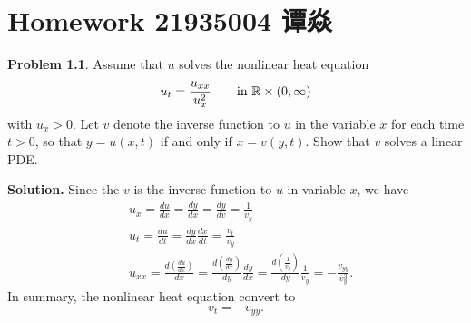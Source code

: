 \documentclass[a4paper]{book}
\makeatletter
\newenvironment{solution}%
{\noindent\textbf{Solution.}}%
{\qedhere}
\newcommand{\voidenvironment}[1]{%
  \expandafter\providecommand\csname env@#1@save@env\endcsname{}%
  \expandafter\providecommand\csname env@#1@process\endcsname{}%
  \@ifundefined{#1}{}{\RenewEnviron{#1}{}}%
}
\numberwithin{equation}{chapter}
\theoremstyle{definition}
\newtheorem{pro}[exm]{Problem}
\makeatother
\begin{document}
\pagestyle{empty}
% 



\setcounter{chapter}{10}




\chapter{Homework 21935004 谭焱}


\begin{pro}
  Assume that $u$ solves the nonlinear heat equation
  \[u_t = \frac{u_{xx}}{u_x^2} \qquad \textmd{in } \mathbb{R} \times (0, \infty)\]
  with $u_x > 0$. Let $v$ denote the inverse function to $u$ in the variable $x$ for each time $t > 0$, so that $y = u(x,t)$ if and only if $x = v(y,t)$. Show that $v$ solves a linear PDE.
\end{pro}

\begin{solution}
  Since the $v$ is the inverse function to $u$ in variable $x$, we have
  \begin{align*}
    &u_x = \frac{d u}{d x} 
    =\frac{d y}{d x}
    =\frac{d y}{d v}
      =\frac{1}{v_y} \\
    &u_t = \frac{du}{dt}
      = \frac{dy}{dx} \frac{dx}{dt}
      = \frac{v_t}{v_y}\\
    &u_{xx} = \frac{d \left( \frac{du}{dx} \right)}{dx}
    = \frac{d \left( \frac{d y}{dx} \right)}{dy} \frac{dy}{dx}
    = \frac{d \left( \frac{1}{v_y} \right)}{dy} \frac{1}{v_y}
    = -\frac{v_{yy}}{v_y^3}.
  \end{align*}
  In summary, the nonlinear heat equation convert to
  \[v_t = -v_{yy}.\]
\end{solution}
\end{document}
